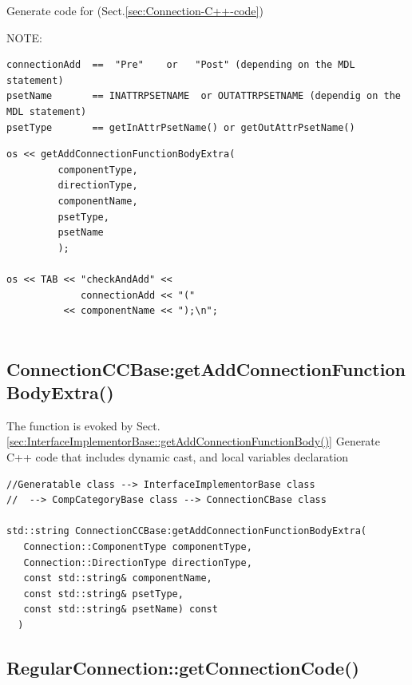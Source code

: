 Generate code for  (Sect.\ref{sec:Connection-C++-code})

NOTE: 
\begin{verbatim}
connectionAdd  ==  "Pre"    or   "Post" (depending on the MDL statement)
psetName       == INATTRPSETNAME  or OUTATTRPSETNAME (dependig on the MDL statement) 
psetType       == getInAttrPsetName() or getOutAttrPsetName()
\end{verbatim}


\begin{verbatim}
os << getAddConnectionFunctionBodyExtra(
         componentType,
         directionType,
         componentName,
         psetType,
         psetName
         );

os << TAB << "checkAndAdd" <<
             connectionAdd << "("
          << componentName << ");\n";
                   
\end{verbatim}

\subsection{ConnectionCCBase:getAddConnectionFunctionBodyExtra()}
\label{sec:ConnectionCCBase:getAddConnectionFunctionBodyExtra()}

The function is evoked by Sect.\ref{sec:InterfaceImplementorBase::getAddConnectionFunctionBody()}
Generate C++ code that includes dynamic cast, and local variables declaration

\begin{verbatim}
//Generatable class --> InterfaceImplementorBase class
//  --> CompCategoryBase class --> ConnectionCBase class

std::string ConnectionCCBase:getAddConnectionFunctionBodyExtra(
   Connection::ComponentType componentType,
   Connection::DirectionType directionType,
   const std::string& componentName,
   const std::string& psetType,
   const std::string& psetName) const
  )
\end{verbatim}

\subsection{RegularConnection::getConnectionCode()}
\label{sec:RegularConnection::getConnectionCode()}

